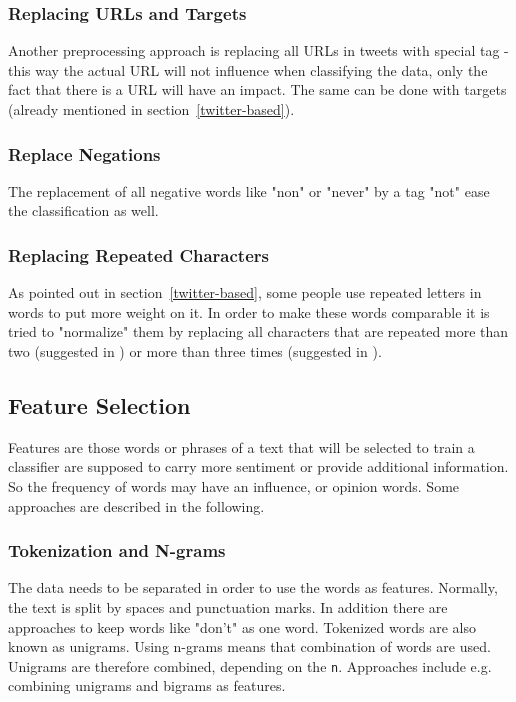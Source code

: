 \documentclass{acm_proc_article-sp}
\begin{document}
\subsubsection{Replacing URLs and Targets}
Another preprocessing approach is replacing all URLs in tweets with special tag - this way the actual URL will not influence when classifying the data, only the fact that there is a URL will have an impact.
The same can be done with targets (already mentioned in section~\ref{twitter-based}).

\subsubsection{Replace Negations}
The replacement of all negative words like "non" or "never" by a tag "not" ease the classification as well.

\subsubsection{Replacing Repeated Characters}
As pointed out in section~\ref{twitter-based}, some people use repeated letters in words to put more weight on it. In order to make these words comparable it is tried to "normalize" them by replacing all characters that are repeated more than two (suggested in \cite{go2009twitter}) or more than three times (suggested in \cite{agarwal2011sentiment}).

\subsection{Feature Selection}
Features are those words or phrases of a text that will be selected to train a classifier are  supposed to carry more sentiment or provide additional information. So the frequency of words may have an influence, or opinion words. Some approaches are described in the following.

\subsubsection{Tokenization and N-grams}
The data needs to be separated in order to use the words as features. Normally, the text is split by spaces and punctuation marks. In addition there are approaches to keep words like "don't" as one word. \cite{pak2010twitter} Tokenized words are also known as unigrams.
Using n-grams means that combination of words are used. Unigrams are therefore combined, depending on the \texttt{n}. Approaches include e.g. combining unigrams and bigrams as features. 
\cite{liu2010sentimentanalysis, go2009twitter}
\end{document}
